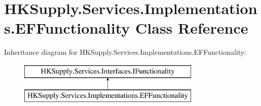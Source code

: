 \hypertarget{class_h_k_supply_1_1_services_1_1_implementations_1_1_e_f_functionality}{}\section{H\+K\+Supply.\+Services.\+Implementations.\+E\+F\+Functionality Class Reference}
\label{class_h_k_supply_1_1_services_1_1_implementations_1_1_e_f_functionality}
Inheritance diagram for H\+K\+Supply.\+Services.\+Implementations.\+E\+F\+Functionality\+:\begin{figure}[H]
\begin{center}
\leavevmode
\includegraphics[height=2.000000cm]{class_h_k_supply_1_1_services_1_1_implementations_1_1_e_f_functionality}
\end{center}
\end{figure}
